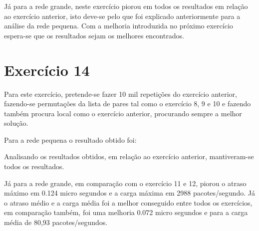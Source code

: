\documentclass[pdftex,12pt,a4paper]{report}
\begin{document}
Já para a rede grande, neste exercício piorou em todos os resultados em relação ao exercício anterior, isto deve-se pelo que foi explicado anteriormente para a análise da rede pequena. Com a melhoria introduzida no próximo exercício espera-se que os resultados sejam os melhores encontrados.





\newpage

\section{Exercício 14}

Para este exercício, pretende-se fazer 10 mil repetições do exercício anterior, fazendo-se permutações da lista de pares tal como o exercício 8, 9 e 10 e fazendo também procura local como o exercício anterior, procurando sempre a melhor solução.

Para a rede pequena o resultado obtido foi:







Analisando os resultados obtidos, em relação ao exercício anterior, mantiveram-se todos os resultados.


Já para a rede grande, em comparação com o exercício 11 e 12, piorou o atraso máximo em 0.124 micro segundos e a carga máxima em 2988 pacotes/segundo. Já o atraso médio e a carga média foi a melhor conseguido entre todos os exercícios, em comparação também, foi uma melhoria 0.072 micro segundos e para a carga média de 80,93 pacotes/segundos.




\end{document}
